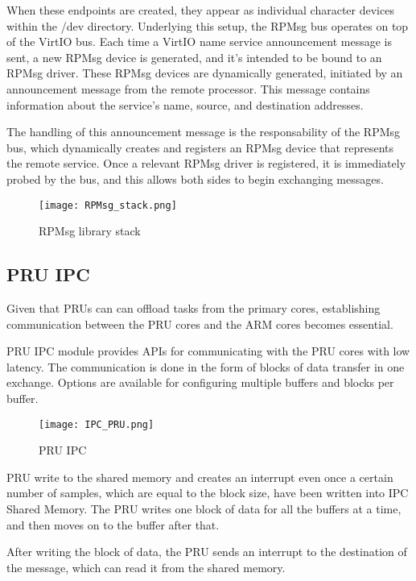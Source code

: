 When these endpoints are created, they appear as individual character devices
within the /dev directory. Underlying this setup, the RPMsg bus operates on top
of the VirtIO bus. Each time a VirtIO name service announcement message is
sent, a new RPMsg device is generated, and it's intended to be bound to an
RPMsg driver. These RPMsg devices are dynamically generated, initiated by an
announcement message from the remote processor. This message contains
information about the service's name, source, and destination addresses.

The handling of this announcement message is the responsability of the
RPMsg bus, which dynamically creates and registers an RPMsg device that
represents the remote service. Once a relevant RPMsg driver is registered, it
is immediately probed by the bus, and this allows both sides to begin
exchanging messages.

\begin{figure}[ht]
    \centering
    \texttt{[image: RPMsg\_stack.png]}
    \caption{RPMsg library stack}
\end{figure}

\subsection{PRU IPC}

Given that PRUs can can offload tasks from the primary cores, establishing 
communication between the PRU cores and the ARM cores becomes essential.

PRU IPC module provides APIs for communicating with the PRU cores with low
latency. The communication is done in the form of blocks of data transfer in
one exchange. Options are available for configuring multiple buffers and blocks
per buffer.

\begin{figure}[ht]
    \centering
    \texttt{[image: IPC\_PRU.png]}
    \caption{PRU IPC}
\end{figure}

PRU write to the shared memory and creates an interrupt even once a certain
number of samples, which are equal to the block size, have been written into
IPC Shared Memory.
The PRU writes one block of data for all the buffers at a time, and then moves
on to the buffer after that.

After writing the block of data, the PRU sends an interrupt to the destination
of the message, which can read it from the shared memory.

